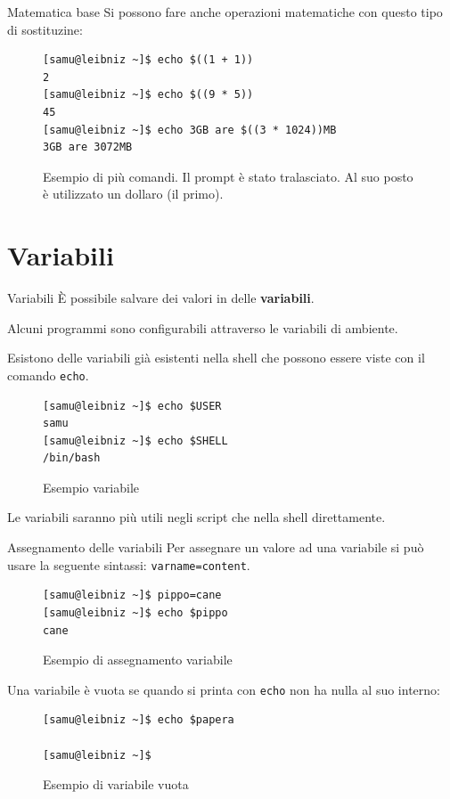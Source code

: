\documentclass{beamer}
\begin{document}
\begin{frame}[fragile]{Matematica base}
  Si possono fare anche operazioni matematiche con questo tipo di sostituzine:
  \begin{figure}
    \begin{lstlisting}
[samu@leibniz ~]$ echo $((1 + 1))
2
[samu@leibniz ~]$ echo $((9 * 5))
45
[samu@leibniz ~]$ echo 3GB are $((3 * 1024))MB
3GB are 3072MB
    \end{lstlisting}
    \caption{Esempio di più comandi. Il prompt è stato tralasciato. Al suo posto
    è utilizzato un dollaro (il primo).}
  \end{figure}
\end{frame}

\section{Variabili}
\begin{frame}[fragile]{Variabili}
  È possibile salvare dei valori in delle \textbf{variabili}. \medskip

  Alcuni programmi sono configurabili attraverso le variabili di ambiente. 
  \medskip

  Esistono delle variabili già esistenti nella shell che possono essere viste
  con il comando \texttt{echo}. \medskip

  \begin{figure}
    \begin{lstlisting}
[samu@leibniz ~]$ echo $USER
samu
[samu@leibniz ~]$ echo $SHELL
/bin/bash
    \end{lstlisting}
    \caption{Esempio variabile}
  \end{figure}

  Le variabili saranno più utili negli script che nella shell direttamente. 
  \medskip
\end{frame}

\begin{frame}[fragile]{Assegnamento delle variabili}
  Per assegnare un valore ad una variabile si può usare la seguente sintassi:
  \texttt{varname=content}.

  \begin{figure}
    \begin{lstlisting}
[samu@leibniz ~]$ pippo=cane
[samu@leibniz ~]$ echo $pippo
cane
    \end{lstlisting}
    \caption{Esempio di assegnamento variabile}
  \end{figure}

  Una variabile è vuota se quando si printa con \texttt{echo} non ha nulla al suo
  interno:
  \begin{figure}
    \begin{lstlisting}
[samu@leibniz ~]$ echo $papera

[samu@leibniz ~]$ 
    \end{lstlisting}
    \caption{Esempio di variabile vuota}
  \end{figure}
\end{frame}
\end{document}
